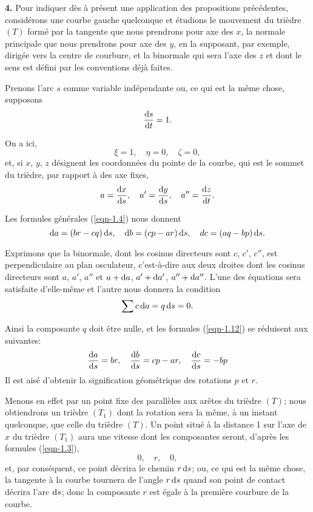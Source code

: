 \textbf{4.} Pour indiquer dès à présent une application des propositions précédentes, considérons une courbe gauche 
quelconque et étudions le mouvement du trièdre $(T)$ formé par la tangente que nous prendrons pour axe des $x$, la 
normale principale que nous prendrons pour axe des $y$, en la supposant, par exemple, dirigée vers la centre de 
courbure, et la binormale qui sera l'axe des $z$ et dont le sens est défini par les conventions déjà faites.

Prenons l'arc $s$ comme variable indépendante ou, ce qui est la même chose, supposons
\[
	\frac{\operatorname{d}\!{s}}{\operatorname{d}\!{t}} = 1.
\]

On a ici,
\[
	\xi = 1, \quad \eta = 0, \quad \zeta = 0,
\]
et, si $x$, $y$, $z$ désignent les coordonnées du pointe de la courbe, qui est le sommet du trièdre, par rapport à des 
axe fixes,
\[
	a = \frac{\operatorname{d}\!{x}}{\operatorname{d}\!{s}}, \quad a' = \frac{\operatorname{d}\!{y}}{\operatorname{d}\!{s}}, \quad a'' = \frac{\operatorname{d}\!{z}}{\operatorname{d}\!{t}}.
\]

Les formules générales (\ref{eqn-1.4}) nous donnent
\begin{equation}
	\operatorname{d}\!{a} = (br - cq)\operatorname{d}\!{s}, \quad \operatorname{d}\!{b} = (cp - ar)\operatorname{d}\!{s}, \quad dc = (aq - bp)\operatorname{d}\!{s}.
	\label{eqn-1.12}
\end{equation}

Exprimons que la binormale, dont les cosinus directeurs sont $c$, $c'$, $c''$, est perpendiculaire au plan osculateur, 
c'est-à-dire aux deux droites dont les cosinus directeurs sont $a$, $a'$, $a''$ et $a + \operatorname{d}\!{a}$, $a' + \operatorname{d}\!{a'}$, $a'' + 
\operatorname{d}\!{a''}$. L'une des équations sera satisfaite d'elle-même et l'autre nous donnera la condition
\[
	\sum{c}\operatorname{d}\!{a} = q \operatorname{d}\!{s} = 0.
\]

Ainsi la composante $q$ doit être nulle, et les formules (\ref{eqn-1.12}) se réduisent aux suivantes:
\begin{equation}
	\frac{\operatorname{d}\!{a}}{\operatorname{d}\!{s}} = br, \quad \frac{\operatorname{d}\!{b}}{\operatorname{d}\!{s}} = cp - ar, \quad \frac{\operatorname{d}\!{c}}{\operatorname{d}\!{s}} = - bp
	\label{eqn-1.13}
\end{equation}
Il est aisé d'obtenir la signification géométrique des rotations $p$ et $r$.

Menons en effet par un point fixe des parallèles aux arêtes du trièdre $(T)$; nous obtiendrons un trièdre $(T_1)$ dont 
la rotation sera la même, à un instant quelconque, que celle du trièdre $(T)$. Un point situé à la distance 1 sur l'axe 
de $x$ du trièdre $(T_1)$ aura une vitesse dont les composantes seront, d'après les formules (\ref{eqn-1.3}),
\[
	0, \quad r, \quad 0,
\]
et, par conséquent, ce point décrira le chemin $r \operatorname{d}\!{s}$; ou, ce qui est la même chose, la tangente à la courbe 
tournera de l'angle $r \operatorname{d}\!{s}$ quand son point de contact décrira l'arc $\operatorname{d}\!{s}$; donc la composante $r$ est égale à la 
première courbure de la courbe.

